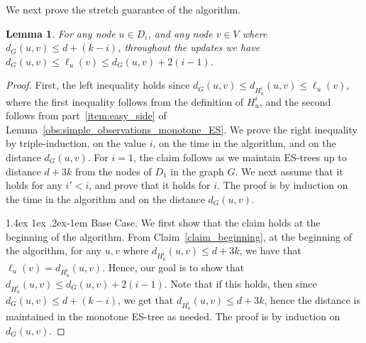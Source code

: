 \documentclass[11pt]{article}
\makeatletter
\newtheorem{lemma}[theorem]{Lemma}
\theoremstyle{definition}
\theoremstyle{remark}
\newcommand{\mtodo}[1]{\todo[color=red!20]{M: #1}}
\renewcommand{\paragraph}{%
  \@startsection{paragraph}{4}%
  {\z@}{1.4ex \@plus 1ex \@minus .2ex}{-1em}%
  {\normalfont\normalsize\bfseries}%
}
\makeatother
\begin{document}
\begin{titlepage}

We next prove the stretch guarantee of the algorithm.


\begin{lemma}\label{lem_additive_stretch}
For any node $u \in D_i$, and any node $v \in V$ where $d_G(u,v) \leq d+(k-i)$, throughout the updates we have $d_G(u,v) \leq \ell_u(v) \leq  d_G(u,v)+ 2(i-1)$.
\end{lemma}

\begin{proof}
First, the left inequality holds since $d_G(u,v) \leq d_{H_u^i}(u,v) \leq \ell_u(v)$, where the first inequality follows from the definition of $H_u^i$, and the second follows from part~\ref{item:easy_side} of Lemma~\ref{obs:simple_observations_monotone_ES}.
We prove the right inequality by triple-induction, on the value $i$, on the time in the algorithm, and on the distance $d_G(u,v)$.
For $i=1$, the claim follows as we maintain ES-trees up to distance $d+3k$ from the nodes of $D_1$ in the graph $G$. We next assume that it holds for any $i' < i$, and prove that it holds for $i$. The proof is by induction on the time in the algorithm and on the distance $d_G(u,v)$.

\paragraph{Base Case.} We first show that the claim holds at the beginning of the algorithm. From Claim~\ref{claim_beginning}, at the beginning of the algorithm, for any $u,v$ where $d_{H_u^i}(u,v) \leq d+3k$, we have that $\ell_u(v) = d_{H_u^i}(u,v).$ Hence, our goal is to show that $d_{H_u^i}(u,v) \leq d_G(u,v) + 2(i-1)$. Note that if this holds, then since $d_G(u,v) \leq d+(k-i)$, we get that $d_{H_u^i}(u,v) \leq d+3k$, hence the distance is maintained in the monotone ES-tree as needed.
The proof is by induction on $d_G(u,v)$.


\end{proof}
\end{titlepage}
\end{document}

